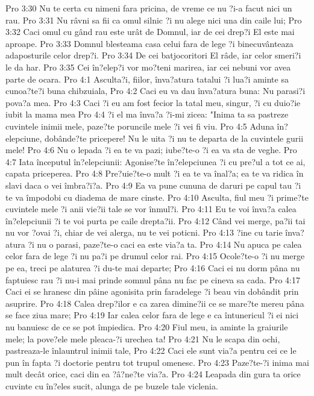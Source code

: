 Pro 3:30  Nu te certa cu nimeni fara pricina, de vreme ce nu ?i-a facut nici un rau.
Pro 3:31  Nu râvni sa fii ca omul silnic ?i nu alege nici una din caile lui;
Pro 3:32  Caci omul cu gând rau este urât de Domnul, iar de cei drep?i El este mai aproape.
Pro 3:33  Domnul blesteama casa celui fara de lege ?i binecuvânteaza adaposturile celor drep?i.
Pro 3:34  De cei batjocoritori El râde, iar celor smeri?i le da har.
Pro 3:35  Cei în?elep?i vor mo?teni marirea, iar cei nebuni vor avea parte de ocara.
Pro 4:1  Asculta?i, fiilor, înva?atura tatalui ?i lua?i aminte sa cunoa?te?i buna chibzuiala,
Pro 4:2  Caci eu va dau înva?atura buna: Nu parasi?i pova?a mea.
Pro 4:3  Caci ?i eu am fost fecior la tatal meu, singur, ?i cu duio?ie iubit la mama mea
Pro 4:4  ?i el ma înva?a ?i-mi zicea: "Inima ta sa pastreze cuvintele inimii mele, paze?te poruncile mele ?i vei fi viu.
Pro 4:5  Aduna în?elepciune, dobânde?te pricepere! Nu le uita ?i nu te departa de la cuvintele gurii mele!
Pro 4:6  Nu o lepada ?i ea te va pazi; iube?te-o ?i ea va sta de veghe.
Pro 4:7  Iata începutul în?elepciunii: Agonise?te în?elepciunea ?i cu pre?ul a tot ce ai, capata priceperea.
Pro 4:8  Pre?uie?te-o mult ?i ea te va înal?a; ea te va ridica în slavi daca o vei îmbra?i?a.
Pro 4:9  Ea va pune cununa de daruri pe capul tau ?i te va împodobi cu diadema de mare cinste.
Pro 4:10  Asculta, fiul meu ?i prime?te cuvintele mele ?i anii vie?ii tale se vor înmul?i.
Pro 4:11  Eu te voi înva?a calea în?elepciunii ?i te voi purta pe caile drepta?ii.
Pro 4:12  Când vei merge, pa?ii tai nu vor ?ovai ?i, chiar de vei alerga, nu te vei poticni.
Pro 4:13  ?ine cu tarie înva?atura ?i nu o parasi, paze?te-o caci ea este via?a ta.
Pro 4:14  Nu apuca pe calea celor fara de lege ?i nu pa?i pe drumul celor rai.
Pro 4:15  Ocole?te-o ?i nu merge pe ea, treci pe alaturea ?i du-te mai departe;
Pro 4:16  Caci ei nu dorm pâna nu faptuiesc rau ?i nu-i mai prinde somnul pâna nu fac pe cineva sa cada.
Pro 4:17  Caci ei se hranesc din pâine agonisita prin faradelege ?i beau vin dobândit prin asuprire.
Pro 4:18  Calea drep?ilor e ca zarea dimine?ii ce se mare?te mereu pâna se face ziua mare;
Pro 4:19  Iar calea celor fara de lege e ca întunericul ?i ei nici nu banuiesc de ce se pot împiedica.
Pro 4:20  Fiul meu, ia aminte la graiurile mele; la pove?ele mele pleaca-?i urechea ta!
Pro 4:21  Nu le scapa din ochi, pastreaza-le înlauntrul inimii tale,
Pro 4:22  Caci ele sunt via?a pentru cei ce le pun în fapta ?i doctorie pentru tot trupul omenesc.
Pro 4:23  Paze?te-?i inima mai mult decât orice, caci din ea ?â?ne?te via?a.
Pro 4:24  Leapada din gura ta orice cuvinte cu în?eles sucit, alunga de pe buzele tale viclenia.
